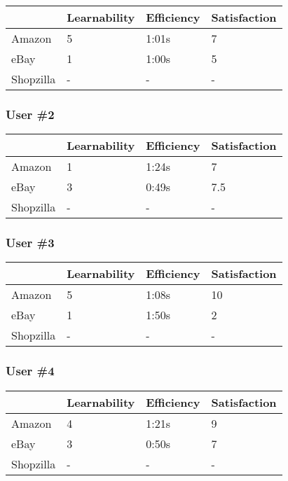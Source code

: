 \documentclass[11pt, oneside]{article}   	%
\begin{document}
\begin{tabular}{| l | l | l | l |}
    \hline
     & Learnability & Efficiency & Satisfaction \\ \hline
    Amazon & 5 & 1:01s & 7 \\ \hline
    eBay & 1 & 1:00s & 5 \\ \hline
    Shopzilla & - & - & - \\\hline
\end{tabular}

\subsubsection{User \#2}

\begin{tabular}{| l | l | l | l |}
    \hline
     & Learnability & Efficiency & Satisfaction \\ \hline
    Amazon & 1 & 1:24s & 7 \\ \hline
    eBay & 3 & 0:49s & 7.5 \\ \hline
    Shopzilla & - & - & - \\\hline
\end{tabular}

\subsubsection{User \#3}

\begin{tabular}{| l | l | l | l |}
    \hline
     & Learnability & Efficiency & Satisfaction \\ \hline
    Amazon & 5 & 1:08s & 10 \\ \hline
    eBay & 1 & 1:50s & 2 \\ \hline
    Shopzilla & - & - & - \\\hline
\end{tabular}

\subsubsection{User \#4}

\begin{tabular}{| l | l | l | l |}
    \hline
     & Learnability & Efficiency & Satisfaction \\ \hline
    Amazon & 4 & 1:21s & 9 \\ \hline
    eBay & 3 & 0:50s & 7 \\ \hline
    Shopzilla & - & - & - \\\hline
\end{tabular}
\end{document}
